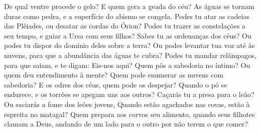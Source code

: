 {  De qual ventre procede o gelo? E quem gera a geada do céu?
  As águas se tornam duras como pedra, e a superfície do abismo se congela.
  Podes tu atar as cadeias das Plêiades, ou desatar as cordas do Órion?
  Podes tu trazer as constelações
 a seu tempo, e guiar a Ursa com seus filhos?
  Sabes tu as ordenanças dos céus? Ou podes tu dispor do domínio deles sobre a terra?
  Ou podes levantar tua voz até às nuvens, para que a abundância das águas te cubra?
  Podes tu mandar relâmpagos, para que saiam, e te digam: Eis-nos aqui?
  Quem pôs a sabedoria no íntimo? Ou quem deu entendimento à mente?
  Quem pode enumerar as nuvens com sabedoria? E os odres dos céus, quem pode os despejar?
  Quando o pó se endurece, e os torrões se apegam uns aos outros?
  Caçarás tu a presa para o leão? Ou saciarás a fome dos leões jovens,
  Quando estão agachados nas covas,
{} estão à espreita no matagal?
  Quem prepara aos corvos seu alimento, quando seus filhotes clamam a Deus, andando de um lado para o outro por não terem o que comer?
\par }

